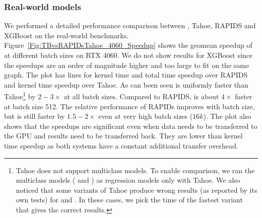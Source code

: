 \subsubsection*{Real-world models}
We performed a detailed performance comparison between \Treebeard{}, Tahoe, RAPIDS and XGBoost on the real-world benchmarks.
Figure~\ref{Fig:TBvsRAPIDsTahoe_4060_Speedup} shows the geomean speedup of \Treebeard{} at different batch sizes on RTX 4060. 
We do not show results for XGBoost since the speedups are an order of magnitude higher and too large to fit on the same graph.  
The plot has lines for kernel time and total time speedup over RAPIDS and kernel time speedup over Tahoe. As can been seen 
\Treebeard{} is uniformly faster than Tahoe{\footnote{Tahoe does not support multiclass models. To enable comparison, we ran 
the multiclass models ( and ) as regression models only with Tahoe. We also noticed that some variants
of Tahoe produce wrong results (as reported by its own tests) for  and . In these cases, we pick the 
time of the fastest variant that gives the correct results.}} by $2-3\times$ at all batch sizes. 
Compared to RAPIDS, \Treebeard{} is about $4\times$ faster at batch size 512. The relative performance of RAPIDs improves 
with batch size, but \Treebeard{} is still faster by $1.5-2\times$ even at very high batch sizes ($16k$). 
The plot also shows that the speedups are significant even when data needs to be transferred to the GPU and results need to
be transferred back. They are lower than kernel time speedup as both systems have a constant additional transfer overhead.
 
